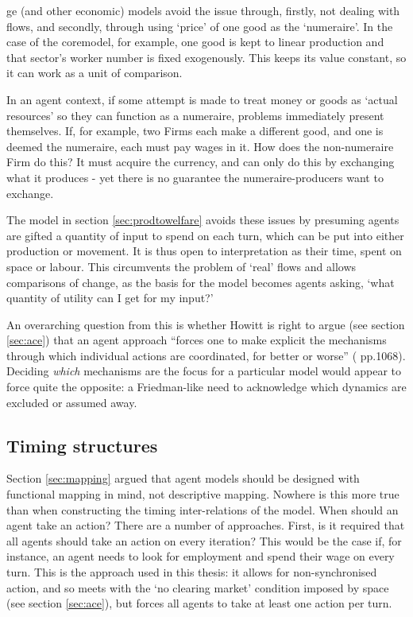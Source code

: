 {\gls{ge} (and other economic) models avoid the issue through, firstly, not dealing with flows, and secondly, through using `price' of one good as the `numeraire'. In the case of the \gls{coremodel}, for example, one good is kept to linear production and that sector's worker number is fixed exogenously. This keeps its value constant, so it can work as a unit of comparison.

In an agent context, if some attempt is made to treat money or goods as `actual resources' so they can function as a numeraire, problems immediately present themselves. If, for example, two Firms each make a different good, and one is deemed the numeraire, each must pay wages in it. How does the non-numeraire Firm do this? It must acquire the currency, and can only do this by exchanging what it produces - yet there is no guarantee the numeraire-producers want to exchange. 

The model in section \ref{sec:prodtowelfare} avoids these issues by presuming agents are gifted a quantity of input to spend on each turn, which can be put into either production or movement. It is thus open to interpretation as their time, spent on space or labour. This circumvents the problem of `real' flows and allows comparisons of change, as the basis for the model becomes agents asking, `what quantity of utility can I get for my input?'

An overarching question from this is whether Howitt is right to argue (see section \ref{sec:ace}) that an agent approach ``forces one to make explicit the mechanisms through which individual actions are coordinated, for better or worse'' (\citealt{howitt_coordination_2006} pp.1068). Deciding \emph{which} mechanisms are the focus for a particular model would appear to force quite the opposite: a Friedman-like need to acknowledge which dynamics are excluded or assumed away.

\subsection{Timing structures \label{sec:timingstr}}

Section \ref{sec:mapping} argued that agent models should be designed with functional mapping in mind, not descriptive mapping. Nowhere is this more true than when constructing the timing inter-relations of the model. When should an agent take an action? There are a number of approaches. First, is it required that all agents should take an action on every iteration? This would be the case if, for instance, an agent needs to look for employment and spend their wage on every turn. This is the approach used in this thesis: it allows for non-synchronised action, and so meets with the `no clearing market' condition imposed by space (see section \ref{sec:ace}), but forces all agents to take at least one action per turn. 

}

